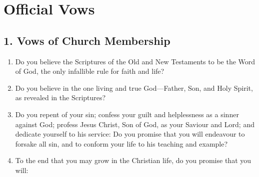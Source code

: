 \chapter{Official Vows}

\section[1. Vows of Church Membership]{1. Vows of Church Membership} 

\begin{enumerate}
  \item Do you believe the Scriptures of the Old and New Testaments to be the Word of God, the only infallible rule for faith and life?
  \item Do you believe in the one living and true God---Father, Son, and Holy Spirit, as revealed in the Scriptures?
  \item Do you repent of your sin; confess your guilt and helplessness as a sinner against God; profess Jesus Christ, Son of God, as your Saviour and Lord; and dedicate yourself to his service: Do you promise that you will endeavour to forsake all sin, and to conform your life to his teaching and example?
  \item To the end that you may grow in the Christian life, do you promise that you will:


\end{enumerate}
